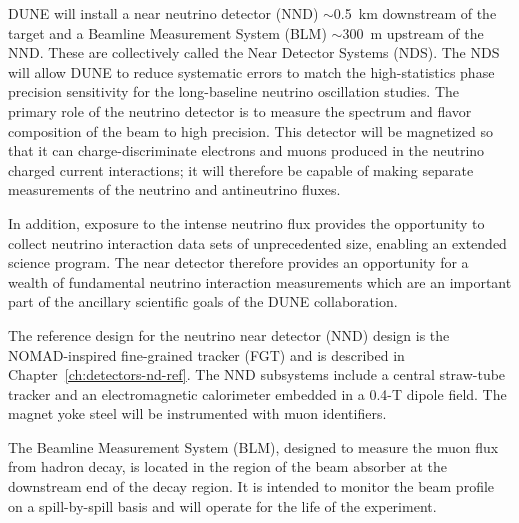 DUNE will install a near neutrino detector (NND) $\sim$0.5~km
downstream of the target and a Beamline Measurement System (BLM)
$\sim$300~m upstream of the NND. These are collectively called the
Near Detector Systems (NDS).  The NDS will allow DUNE to reduce
systematic errors to match the high-statistics phase precision sensitivity
for the long-baseline neutrino oscillation studies.  The primary role
of the neutrino detector is to measure the spectrum and flavor
composition of the beam to high precision. This detector will be
magnetized so that it can charge-discriminate electrons and muons
produced in the neutrino charged current interactions; it will
therefore be capable of making separate measurements of the neutrino
and antineutrino fluxes.
%

In addition, exposure to the intense neutrino flux provides the
opportunity to collect neutrino interaction data sets of unprecedented
size, enabling an extended science program.  The near detector
therefore provides an opportunity for a wealth of fundamental neutrino
interaction measurements which are an important part of the ancillary
scientific goals of the DUNE collaboration.

The reference design for the neutrino near detector (NND) design is
the NOMAD-inspired fine-grained tracker (FGT) and is described in
Chapter~\ref{ch:detectors-nd-ref}. The NND subsystems include a
central straw-tube tracker and an electromagnetic calorimeter embedded
in a 0.4-T dipole field. The magnet yoke steel will be instrumented
with muon identifiers.

The Beamline Measurement System (BLM), designed to measure the muon
flux from hadron decay, is located in the region of the beam absorber
at the downstream end of the decay region. It is intended to monitor
the beam profile on a spill-by-spill basis and will operate for the
life of the experiment.
